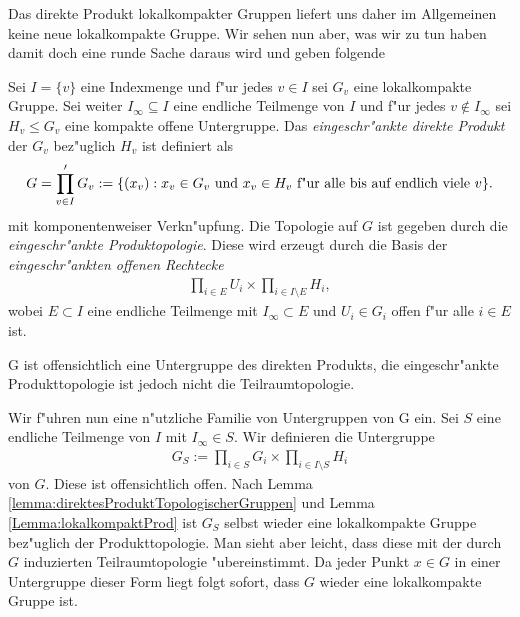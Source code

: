 		Das direkte Produkt lokalkompakter Gruppen liefert uns daher im Allgemeinen keine neue lokalkompakte Gruppe. Wir sehen nun aber, was wir zu tun haben damit doch eine runde Sache daraus wird und geben folgende
		\begin{defi}
			Sei $I=\{v\}$ eine Indexmenge und f"ur jedes $v \in I$ sei $G_v$ eine lokalkompakte Gruppe. 
			Sei weiter $I_\infty \subseteq I$ eine endliche Teilmenge von $I$ und f"ur jedes $v \notin I_\infty$ sei $H_v\leq G_v$ eine kompakte offene Untergruppe. 
			Das \emph{eingeschr"ankte direkte Produkt} der $G_v$ bez"uglich $H_v$ ist definiert als 
			\begin{align*}
				G = \prod\limits_{v \in I}' G_v := \{ (x_v): x_v \in G_v \text{ und } x_v \in H_v \text{ f"ur alle bis auf endlich viele } v \}.
			\end{align*}
			mit komponentenweiser Verkn"upfung. Die Topologie auf $G$ ist gegeben durch die \emph{eingeschr"ankte Produktopologie}. Diese wird erzeugt durch die Basis der \emph{eingeschr"ankten offenen Rechtecke}
			\begin{align*}
				\prod_{i \in E} U_i \times \prod_{i \in I\setminus E} H_i,
			\end{align*}
			wobei $E \subset I$ eine endliche Teilmenge mit $I_\infty \subset E$ und $U_i \in G_i$ offen f"ur alle $i \in E$ ist.
		\end{defi}
		G ist offensichtlich eine Untergruppe des direkten Produkts, die eingeschr"ankte Produkttopologie ist jedoch nicht die Teilraumtopologie.
		
		Wir f"uhren nun eine n"utzliche Familie von Untergruppen von G ein. Sei $S$ eine endliche Teilmenge von $I$ mit $I_\infty \in S$. Wir definieren die Untergruppe
		\begin{align*}
			G_S := \prod_{i \in S}G_i \times \prod_{i \in I\setminus S} H_i
		\end{align*}
		von $G$. Diese ist offensichtlich offen. Nach Lemma \ref{lemma:direktesProduktTopologischerGruppen} und Lemma \ref{Lemma:lokalkompaktProd} ist $G_S$ selbst wieder eine lokalkompakte Gruppe bez"uglich der Produkttopologie. Man sieht aber leicht, dass diese mit der durch $G$ induzierten Teilraumtopologie "ubereinstimmt. Da jeder Punkt $x \in G$ in einer Untergruppe dieser Form liegt folgt sofort, dass $G$ wieder eine lokalkompakte Gruppe ist.
		
